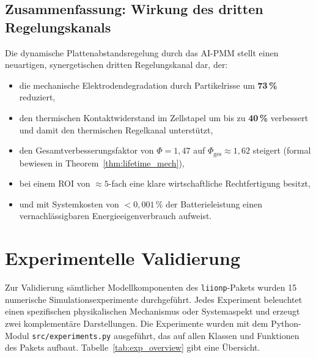 ﻿\documentclass[12pt,a4paper]{article}
\begin{document}
\subsection{Zusammenfassung: Wirkung des dritten Regelungskanals}

Die dynamische Plattenabstandsregelung durch das AI-PMM stellt einen
neuartigen, synergetischen dritten Regelungskanal dar, der:

\begin{itemize}[leftmargin=*]
	\item die mechanische Elektrodendegradation durch Partikelrisse um
	\textbf{73\,\%} reduziert,
	\item den thermischen Kontaktwiderstand im Zellstapel um bis zu
	\textbf{40\,\%} verbessert und damit den thermischen Regelkanal unterstützt,
	\item den Gesamtverbesserungsfaktor von $\Phi = 1{,}47$ auf
	$\Phi_\mathrm{ges} \approx 1{,}62$ steigert (formal bewiesen in
	Theorem~\ref{thm:lifetime_mech}),
	\item bei einem ROI von $\approx 5$-fach eine klare wirtschaftliche
	Rechtfertigung besitzt,
	\item und mit Systemkosten von $< 0{,}001\,\%$ der Batterieleistung
	einen vernachlässigbaren Energieeigenverbrauch aufweist.
\end{itemize}

	\section{Experimentelle Validierung}
	\label{sec:validierung}

	Zur Validierung sämtlicher Modellkomponenten des \texttt{liionp}-Pakets wurden
	15 numerische Simulationsexperimente durchgeführt. Jedes Experiment beleuchtet
	einen spezifischen physikalischen Mechanismus oder Systemaspekt und erzeugt
	zwei komplementäre Darstellungen. Die Experimente wurden mit dem Python-Modul
	\texttt{src/experiments.py} ausgeführt, das auf allen Klassen und Funktionen
	des Pakets aufbaut. Tabelle~\ref{tab:exp_overview} gibt eine Übersicht.
\end{document}
